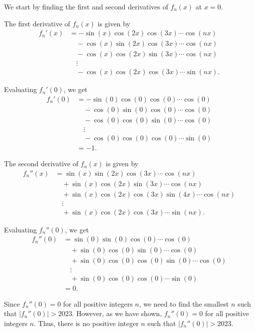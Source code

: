 We start by finding the first and second derivatives of $f_n(x)$ at $x=0$.

The first derivative of $f_n(x)$ is given by
\begin{align*}
f_n'(x) &= -\sin(x)\cos(2x)\cos(3x)\cdots\cos(nx) \\
&\quad - \cos(x)\sin(2x)\cos(3x)\cdots\cos(nx) \\
&\quad - \cos(x)\cos(2x)\sin(3x)\cdots\cos(nx) \\
&\quad \vdots \\
&\quad - \cos(x)\cos(2x)\cos(3x)\cdots\sin(nx).
\end{align*}

Evaluating $f_n'(0)$, we get
\begin{align*}
f_n'(0) &= -\sin(0)\cos(0)\cos(0)\cdots\cos(0) \\
&\quad - \cos(0)\sin(0)\cos(0)\cdots\cos(0) \\
&\quad - \cos(0)\cos(0)\sin(0)\cdots\cos(0) \\
&\quad \vdots \\
&\quad - \cos(0)\cos(0)\cos(0)\cdots\sin(0) \\
&= -1.
\end{align*}

The second derivative of $f_n(x)$ is given by
\begin{align*}
f_n''(x) &= \sin(x)\sin(2x)\cos(3x)\cdots\cos(nx) \\
&\quad + \sin(x)\cos(2x)\sin(3x)\cdots\cos(nx) \\
&\quad + \sin(x)\cos(2x)\cos(3x)\sin(4x)\cdots\cos(nx) \\
&\quad \vdots \\
&\quad + \sin(x)\cos(2x)\cos(3x)\cdots\sin(nx).
\end{align*}

Evaluating $f_n''(0)$, we get
\begin{align*}
f_n''(0) &= \sin(0)\sin(0)\cos(0)\cdots\cos(0) \\
&\quad + \sin(0)\cos(0)\sin(0)\cdots\cos(0) \\
&\quad + \sin(0)\cos(0)\cos(0)\sin(0)\cdots\cos(0) \\
&\quad \vdots \\
&\quad + \sin(0)\cos(0)\cos(0)\cdots\sin(0) \\
&= 0.
\end{align*}

Since $f_n''(0) = 0$ for all positive integers $n$, we need to find the smallest $n$ such that $|f_n''(0)| > 2023$. However, as we have shown, $f_n''(0) = 0$ for all positive integers $n$. Thus, there is no positive integer $n$ such that $|f_n''(0)| > 2023$.

